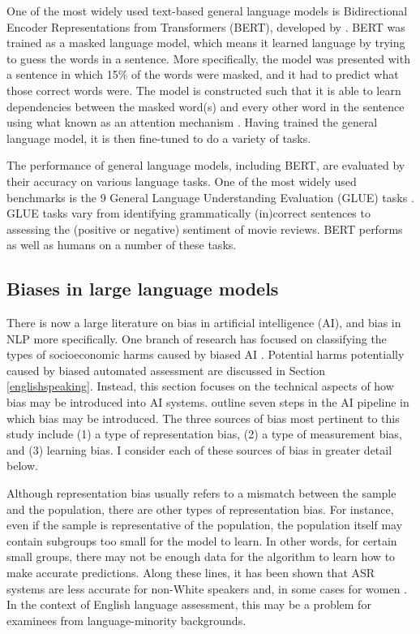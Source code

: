 \documentclass [PhD] {uclathes}
\begin{document}
One of the most widely used text-based general language models is Bidirectional Encoder Representations from Transformers (BERT), developed by \citet{devlin2018}. BERT was trained as a masked language model, which means it learned language by trying to guess the words in a sentence. More specifically, the model was presented with a sentence in which 15\% of the words were masked, and it had to predict what those correct words were. The model is constructed such that it is able to learn dependencies between the masked word(s) and every other word in the sentence using what known as an attention mechanism \citep{vaswani2017attention}. Having trained the general language model, it is then fine-tuned to do a variety of tasks.

The performance of general language models, including BERT, are evaluated by their accuracy on various language tasks. One of the most widely used benchmarks is the 9 General Language Understanding Evaluation (GLUE) tasks \citep{wang2018glue}. GLUE tasks vary from identifying grammatically (in)correct sentences to assessing the (positive or negative) sentiment of movie reviews. BERT performs as well as humans on a number of these tasks.

\subsection{Biases in large language models}
\label{lit_ml_bias}

There is now a large literature on bias in artificial intelligence (AI), and bias in NLP more specifically. One branch of research has focused on classifying the types of socioeconomic harms caused by biased AI \citep[e.g.][]{blodgett2020}. Potential harms potentially caused by biased automated assessment are discussed in Section \ref{englishspeaking}. Instead, this section focuses on the technical aspects of how bias may be introduced into AI systems. \citet{suresh2021framework} outline seven steps in the AI pipeline in which bias may be introduced. The three sources of bias most pertinent to this study include (1) a type of representation bias, (2) a type of measurement bias, and (3) learning bias. I consider each of these sources of bias in greater detail below.

Although representation bias usually refers to a mismatch between the sample and the population, there are other types of representation bias. For instance, even if the sample is representative of the population, the population itself may contain subgroups too small for the model to learn. In other words, for certain small groups, there may not be enough data for the algorithm to learn how to make accurate predictions. Along these lines, it has been shown that ASR systems are less accurate for non-White speakers \citep{koenecke2020} and, in some cases for women \citep{tatman2017a, tatman2017b}. In the context of English language assessment, this may be a problem for examinees from language-minority backgrounds.
\end{document}
